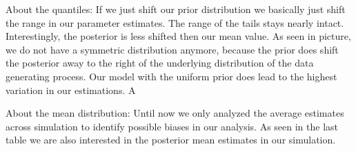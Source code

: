 About the quantiles:
If we just shift our prior distribution we basically just shift the range in our parameter estimates. The range of the tails stays nearly intact. Interestingly, the posterior is less shifted then our mean value. As seen in picture, we do not have a symmetric distribution anymore, because the prior does shift the posterior away to the right of the underlying distribution of the data generating process.
Our model with the uniform prior does lead to the highest variation in our estimations. A

About the mean distribution:
Until now we only analyzed the average estimates across simulation to identify possible biases in our analysis. As seen in the last table we are also interested in the posterior mean estimates in our simulation.




